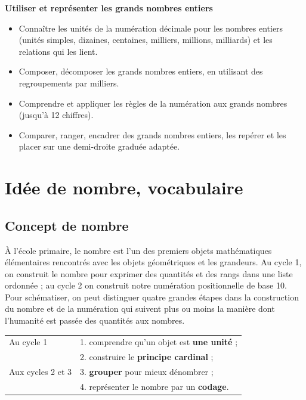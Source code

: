 \begin{prerequis} 
   {\footnotesize
   {\bf Utiliser et représenter les grands nombres entiers}
   \begin{itemize}
      \item Connaître les unités de la numération décimale pour les nombres entiers (unités simples, dizaines, centaines, milliers, millions, milliards) et les relations qui les lient.
      \item Composer, décomposer les grands nombres entiers, en utilisant des regroupements par milliers.
      \item Comprendre et appliquer les règles de la numération aux grands nombres (jusqu’à 12 chiffres).
      \item Comparer, ranger, encadrer des grands nombres entiers, les repérer et les placer sur une demi-droite graduée adaptée.
   \end{itemize}}  
\end{prerequis}


\reperes %

\section{Idée de nombre, vocabulaire} %


\subsection{Concept de nombre}

   À l'école primaire, le nombre est l'un des premiers objets mathématiques élémentaires rencontrés avec les objets géométriques et les grandeurs. Au cycle 1, on construit le nombre pour exprimer des quantités et des rangs dans une liste ordonnée ; au cycle 2 on construit notre numération positionnelle de base 10. Pour schématiser, on peut distinguer quatre grandes étapes dans la construction du nombre et de la numération qui suivent plus ou moins la manière dont l'humanité est passée des quantités aux nombres.
   
{\renewcommand{\StringDOCUMENTATION}{Étapes de construction de notre numération}
\begin{documentation}
   \begin{tabular}{m{2.8cm}m{8cm}}
      Au cycle 1 & 1. comprendre qu'un objet est \textbf{une unité} ; \\
      & 2. construire le \textbf{principe cardinal} ; \\
      Aux cycles 2 et 3 & 3. \textbf{grouper} pour mieux dénombrer ; \\
      & 4. représenter le nombre par un \textbf{codage}.
   \end{tabular}
\end{documentation}}

